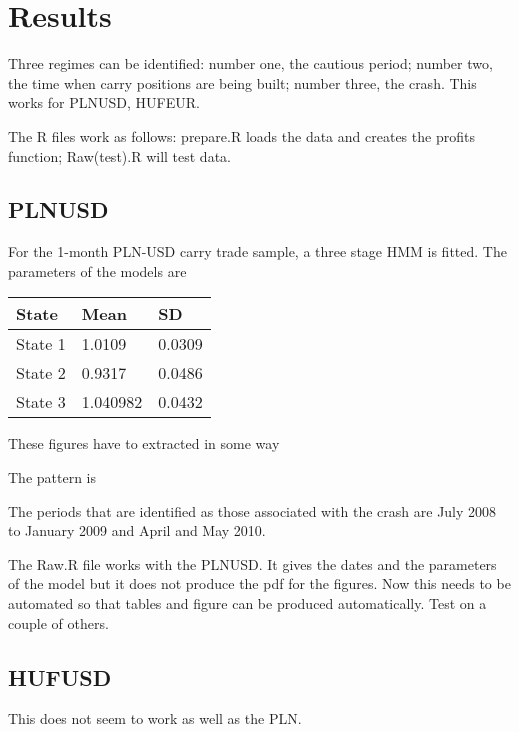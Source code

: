 \documentclass[12pt, a4paper, oneside]{article} %
\begin{document}
\section{Results}
Three regimes can be identified: number one, the cautious period; number two, the time when carry positions are being built; number three, the crash.  This works for PLNUSD, HUFEUR. 

The R files work as follows: prepare.R loads the data and creates the profits function; Raw(test).R will test data. 

\subsection{PLNUSD}
For the 1-month PLN-USD carry trade sample, a three stage HMM is fitted.  The parameters of the models are 

\begin{tabular}{l | l l}
State & Mean & SD \\
\hline
State 1 & 1.0109 & 0.0309\\
State 2 & 0.9317 & 0.0486\\
State 3 & 1.040982 & 0.0432\\
\end{tabular}

These figures have to extracted in some way 

The pattern is 

The periods that are identified as those associated with the crash are July 2008 to January 2009 and April and May 2010.  

The Raw.R file works with the PLNUSD.  It gives the dates and the parameters of the model but it does not produce the pdf for the figures. Now this needs to be automated so that tables and figure can be produced automatically. Test on a couple of others. 

\subsection{HUFUSD}
This does not seem to work as well as the PLN.  
\end{document}

